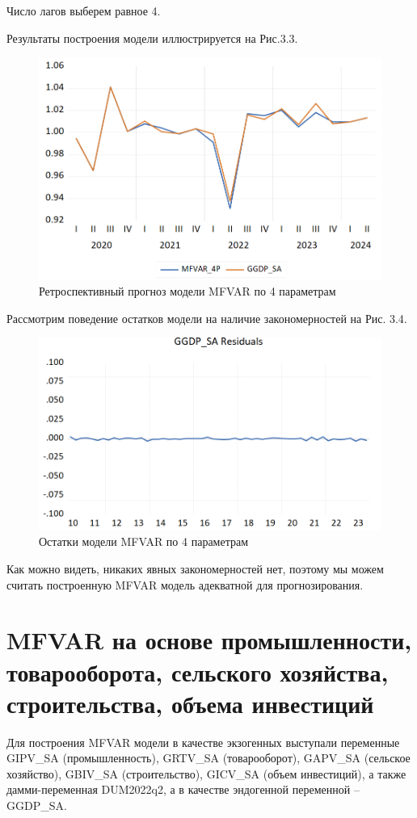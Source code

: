 \documentclass[a4paper, 14pt]{extreport}
\numberwithin{equation}{subsection}
\numberwithin{equation}{section}
\begin{document}
	Число лагов выберем равное 4.
	
	Результаты построения модели
	иллюстрируется на Рис.3.3.
	
	\begin{figure}[h]
		\centering
		\includegraphics[scale=0.5]{images/img17}
		\caption{Ретроспективный прогноз модели MFVAR по 4 параметрам}
		\label{fig:img17}
	\end{figure}
	
	Рассмотрим поведение остатков модели на наличие закономерностей на Рис. 3.4.
	
	\begin{figure}[h!]
		\centering
		\includegraphics[scale=0.5]{images/img18}
		\caption{Остатки модели MFVAR по 4 параметрам}
		\label{fig:img18}
	\end{figure}
	
	Как можно видеть, никаких явных закономерностей нет, поэтому мы можем считать построенную MFVAR модель адекватной для прогнозирования.
	
	\section{MFVAR на основе промышленности, товарооборота, сельского хозяйства, строительства, объема инвестиций}
	Для построения MFVAR модели в качестве экзогенных выступали
	переменные GIPV\_SA (промышленность), GRTV\_SA (товарооборот), GAPV\_SA (сельское хозяйство), GBIV\_SA (строительство), GICV\_SA (объем инвестиций), а также дамми-переменная
	DUM2022q2, а в качестве эндогенной переменной -- GGDP\_SA. 
	
\end{document}
